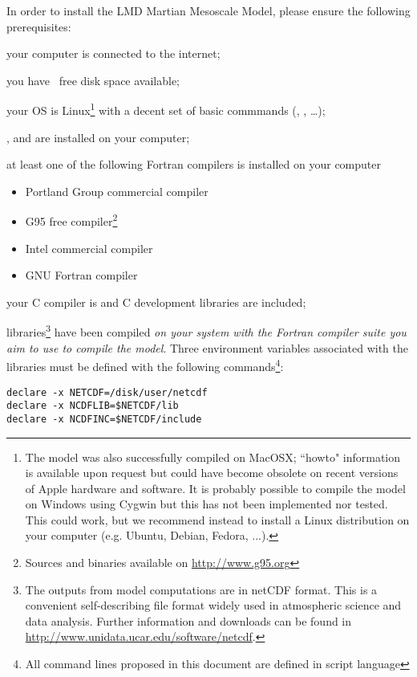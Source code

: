 \sk
In order to install the LMD Martian Mesoscale Model, please ensure the following prerequisites:
\begin{citemize}
\item your computer is connected to the internet;
\item you have~ free disk space available;
\item your OS is Linux\footnote{The model was also successfully compiled on MacOSX; ``howto" information is available upon request but could have become obsolete on recent versions of Apple hardware and software. It is probably possible to compile the model on Windows using Cygwin but this has not been implemented nor tested. This could work, but we recommend instead to install a Linux distribution on your computer (e.g. Ubuntu, Debian, Fedora, ...).} with a decent set of basic commmands (, , \ldots);
\item {},  and  are installed on your computer;
\item at least one of the following Fortran compilers is installed on your computer
\begin{itemize}
\item Portland Group commercial compiler 
\item G95 free compiler\footnote{Sources and binaries available on \url{http://www.g95.org}}  
\item Intel commercial compiler  
\item GNU Fortran compiler 
\end{itemize}
\item your C compiler is  and C development libraries are included;
\item {} libraries\footnote{The outputs from model computations are in netCDF format. This is a convenient self-describing file format widely used in atmospheric science and data analysis. Further information and downloads can be found in \url{http://www.unidata.ucar.edu/software/netcdf}.} have been compiled \emph{on your system with the Fortran compiler suite you aim to use to compile the model}. Three environment variables associated with the  libraries must be defined with the following commands\footnote{All command lines proposed in this document are defined in  script language}:
\begin{verbatim}
declare -x NETCDF=/disk/user/netcdf  
declare -x NCDFLIB=$NETCDF/lib       
declare -x NCDFINC=$NETCDF/include       
\end{verbatim}
\end{citemize} 

